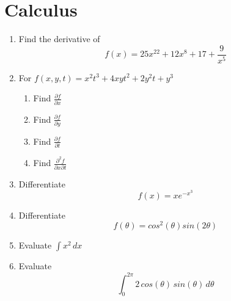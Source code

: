 \documentclass{article}
\begin{document}
\section{Calculus}
\begin{enumerate}[\thesection .1]
\item Find the derivative of
  \begin{equation*}
    f(x) = 25 x^{22} + 12 x^8 + 17 + \frac{9}{x^5}
  \end{equation*}

\item For $f(x, y, t) = x^2 t^3 + 4 x y t^2 + 2 y^2 t + y^3$
  \begin{enumerate}
  \item Find $\frac{\partial f}{\partial x}$
  \item Find $\frac{\partial f}{\partial y}$
  \item Find $\frac{\partial f}{\partial t}$
  \item Find $\frac{\partial ^2 f}{\partial x \partial t}$
  \end{enumerate}

\item Differentiate
  \begin{equation*}
    f(x) = x e^{-x^3}
  \end{equation*}

\item Differentiate
  \begin{equation*}
    f(\theta) = cos^2(\theta) sin(2 \theta)
  \end{equation*}

\item Evaluate $\int x^2\,{dx}$

\item Evaluate
  \begin{equation*}
    \int_{0}^{2 \pi} 2\,cos(\theta)\,sin(\theta)\,d\theta
  \end{equation*}

\end{enumerate}
\end{document}
